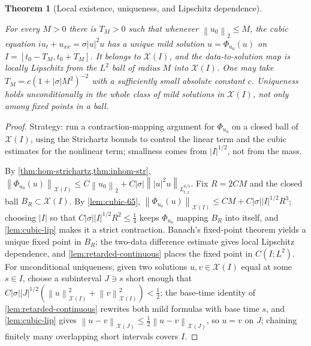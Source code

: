 \documentclass[11pt,oneside]{book}
\providecommand{\uses}[1]{}
\newtheorem{theorem}{Theorem}[chapter]
\theoremstyle{definition}
\theoremstyle{remark}
\newcommand{\1}{\mathbf 1}
\newcommand{\norm}[1]{\left\lVert #1\right\rVert}
\begin{document}
\begin{theorem}[Local existence, uniqueness, and Lipschitz dependence]
\label{thm:LWP}
\uses{def:fixed-point-space, thm:inhom-str, lem:retarded-continuous, lem:cubic-65, lem:cubic-lip}
For every $M>0$ there is $T_M>0$ such that whenever $\norm{u_0}_2\le M$, the
cubic equation $iu_t+u_{xx}=\sigma|u|^2u$ has a unique mild solution
$u=\Phi_{u_0}(u)$ on $I=[t_0-T_M,t_0+T_M]$. It belongs to $\mathcal X(I)$, and
the data-to-solution map is locally Lipschitz from the $L^2$ ball of radius
$M$ into $\mathcal X(I)$. One may take $T_M=c(1+|\sigma|M^2)^{-2}$ with a
sufficiently small absolute constant $c$. Uniqueness holds unconditionally in
the whole class of mild solutions in $\mathcal X(I)$, not only among fixed
points in a ball.
\end{theorem}
\begin{proof}
\uses{thm:hom-strichartz, thm:inhom-str, lem:cubic-65, lem:cubic-lip, lem:retarded-continuous}
Strategy: run a contraction-mapping argument for $\Phi_{u_0}$ on a closed ball
of $\mathcal X(I)$, using the Strichartz bounds to control the linear term and
the cubic estimates for the nonlinear term; smallness comes from $|I|^{1/2}$,
not from the mass.

By \cref{thm:hom-strichartz,thm:inhom-str},
$\norm{\Phi_{u_0}(u)}_{\mathcal X(I)}\le C\norm{u_0}_2+C|\sigma|\norm{|u|^2u}_{L^{6/5}_{t,x}}$.
Fix $R=2CM$ and the closed ball $B_R\subset\mathcal X(I)$. By
\cref{lem:cubic-65}, $\norm{\Phi_{u_0}(u)}_{\mathcal X(I)}\le CM+C|\sigma||I|^{1/2}R^3$;
choosing $|I|$ so that $C|\sigma||I|^{1/2}R^2\le\tfrac14$ keeps $\Phi_{u_0}$
mapping $B_R$ into itself, and \cref{lem:cubic-lip} makes it a strict
contraction. Banach's fixed-point theorem yields a unique fixed point in
$B_R$; the two-data difference estimate gives local Lipschitz dependence, and
\cref{lem:retarded-continuous} places the fixed point in $C(I;L^2)$.
For unconditional uniqueness, given two solutions $u,v\in\mathcal X(I)$ equal
at some $s\in I$, choose a subinterval $J\ni s$ short enough that
$C|\sigma||J|^{1/2}(\norm u_{\mathcal X(I)}^2+\norm v_{\mathcal X(I)}^2)<\tfrac12$;
the base-time identity of \cref{lem:retarded-continuous} rewrites both mild
formulas with base time $s$, and \cref{lem:cubic-lip} gives
$\norm{u-v}_{\mathcal X(J)}\le\tfrac12\norm{u-v}_{\mathcal X(J)}$, so $u=v$ on
$J$; chaining finitely many overlapping short intervals covers $I$.
\end{proof}
\end{document}
